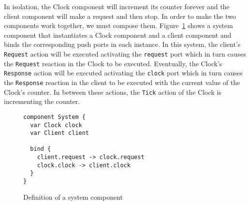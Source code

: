 In isolation, the Clock component will increment its counter forever and the client component will make a request and then stop.
In order to make the two components work together, we must compose them.
Figure~\ref{system_component} shows a system component that instantiates a Clock component and a client component and binds the corresponding push ports in each instance.
In this system, the client's \verb+Request+ action will be executed activating the \verb+request+ port which in turn causes the \verb+Request+ reaction in the Clock to be executed.
Eventually, the Clock's \verb+Response+ action will be executed activating the \verb+clock+ port which in turn causes the \verb+Response+ reaction in the client to be executed with the current value of the Clock's counter.
In between these actions, the \verb+Tick+ action of the Clock is incrementing the counter.

\begin{figure}
\begin{verbatim}
component System {
  var Clock clock
  var Client client

  bind {
    client.request -> clock.request
    clock.clock -> client.clock
  }
}
\end{verbatim}
\caption{Definition of a system component\label{system_component}}
\end{figure}



